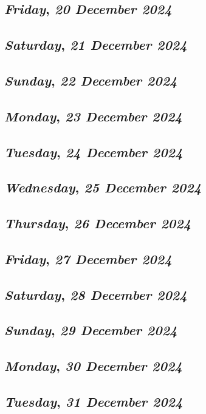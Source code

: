 \def\day{\textit{20 December 2024}}
\def\weekday{\textit{Friday}}
\subsection*{\weekday, \day}

\def\day{\textit{21 December 2024}}
\def\weekday{\textit{Saturday}}
\subsection*{\weekday, \day}

\def\day{\textit{22 December 2024}}
\def\weekday{\textit{Sunday}}
\subsection*{\weekday, \day}

\def\day{\textit{23 December 2024}}
\def\weekday{\textit{Monday}}
\subsection*{\weekday, \day}

\def\day{\textit{24 December 2024}}
\def\weekday{\textit{Tuesday}}
\subsection*{\weekday, \day}

\def\day{\textit{25 December 2024}}
\def\weekday{\textit{Wednesday}}
\subsection*{\weekday, \day}

\def\day{\textit{26 December 2024}}
\def\weekday{\textit{Thursday}}
\subsection*{\weekday, \day}

\def\day{\textit{27 December 2024}}
\def\weekday{\textit{Friday}}
\subsection*{\weekday, \day}

\def\day{\textit{28 December 2024}}
\def\weekday{\textit{Saturday}}
\subsection*{\weekday, \day}

\def\day{\textit{29 December 2024}}
\def\weekday{\textit{Sunday}}
\subsection*{\weekday, \day}

\def\day{\textit{30 December 2024}}
\def\weekday{\textit{Monday}}
\subsection*{\weekday, \day}

\def\day{\textit{31 December 2024}}
\def\weekday{\textit{Tuesday}}
\subsection*{\weekday, \day}
